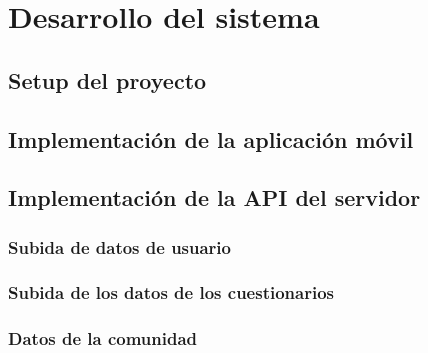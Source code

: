 \chapter{Desarrollo del sistema}
    \label{chapter:desarrollo}

    
    \section{Setup del proyecto}

    \section{Implementación de la aplicación móvil}

    \section{Implementación de la API del servidor}

        \subsection{Subida de datos de usuario}

        \subsection{Subida de los datos de los cuestionarios}

        \subsection{Datos de la comunidad}
